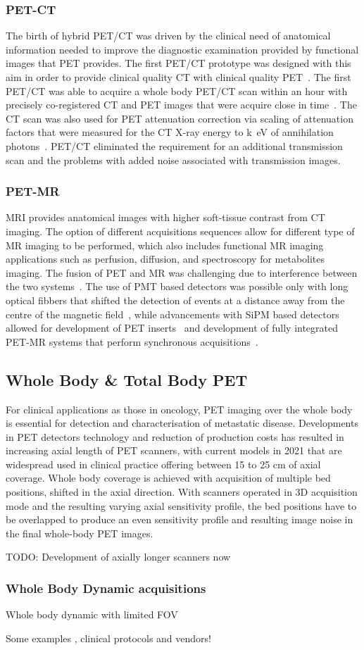 \subsubsection{PET-CT}
The birth of hybrid PET/CT was driven by the clinical need of anatomical information needed to improve the diagnostic examination provided by functional images that PET provides. The first PET/CT prototype was designed with this aim in order to provide clinical quality CT with clinical quality PET~\cite{Townsend2008}. The first PET/CT was able to acquire a whole body PET/CT scan within an hour with precisely co-registered CT and PET images that were acquire close in time~\cite{Beyer2000}. The CT scan was also used for PET attenuation correction via scaling of attenuation factors that were measured for the CT X-ray energy to \si{k\electronvolt} of annihilation photons~\cite{Kinahan1998}. PET/CT eliminated the requirement for an additional transmission scan and the problems with added noise associated with transmission images. 

\subsubsection{PET-MR}
MRI provides anatomical images with higher soft-tissue contrast from CT imaging. The option of different acquisitions sequences allow for different type of MR imaging to be performed, which also includes functional MR imaging applications such as perfusion, diffusion, and spectroscopy for metabolites imaging. 
The fusion of PET and MR was challenging due to interference between the two systems~\cite{Disselhorst2014}. The use of PMT based detectors was possible only with long optical fibbers that shifted the detection of events at a distance away from the centre of the magnetic field~\cite{Shao1997,Mackewn2010}, while advancements with SiPM based detectors allowed for development of PET inserts~\cite{Kolb2012} and development of fully integrated PET-MR systems that perform synchronous acquisitions~\cite{Delso2011,Grant2016,Levin2016}.


\subsection{Whole Body \& Total Body PET}
For clinical applications as those in oncology, PET imaging over the whole body is essential for detection and characterisation of metastatic disease. Developments in PET detectors technology and reduction of production costs has resulted in increasing axial length of PET scanners, with current models in 2021 that are widespread used in clinical practice offering between 15 to 25 cm of axial coverage. Whole body coverage is achieved with acquisition of multiple bed positions, shifted in the axial direction. With scanners operated in 3D acquisition mode and the resulting varying axial sensitivity profile, the bed positions have to be overlapped to produce an even sensitivity profile and resulting image noise in the final whole-body PET images. 

TODO: Development of axially longer scanners now ~\cite{Vandenberghe2020}

\subsubsection{Whole Body Dynamic acquisitions}

Whole body dynamic with limited FOV

Some examples , clinical protocols and vendors!